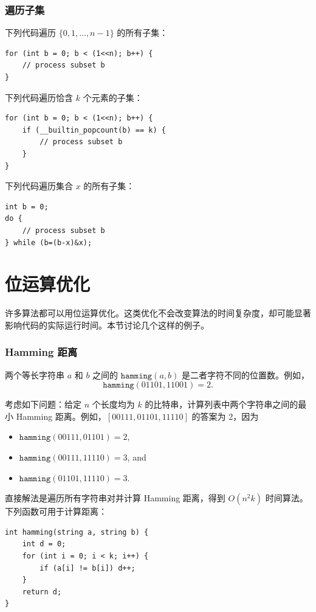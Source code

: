 \subsubsection{遍历子集}

下列代码遍历 $\{0,1,\ldots,n-1\}$ 的所有子集：

\begin{lstlisting}
for (int b = 0; b < (1<<n); b++) {
    // process subset b
}
\end{lstlisting}
下列代码遍历恰含 $k$ 个元素的子集：
\begin{lstlisting}
for (int b = 0; b < (1<<n); b++) {
    if (__builtin_popcount(b) == k) {
        // process subset b
    }
}
\end{lstlisting}
下列代码遍历集合 $x$ 的所有子集：
\begin{lstlisting}
int b = 0;
do {
    // process subset b
} while (b=(b-x)&x);
\end{lstlisting}

\section{位运算优化}

许多算法都可以用位运算优化。这类优化不会改变算法的时间复杂度，却可能显著影响代码的实际运行时间。本节讨论几个这样的例子。

\subsubsection{Hamming 距离}

两个等长字符串 $a$ 和 $b$ 之间的 $\texttt{hamming}(a,b)$ 是二者字符不同的位置数。例如，
\[\texttt{hamming}(01101,11001)=2.\]

考虑如下问题：给定 $n$ 个长度均为 $k$ 的比特串，计算列表中两个字符串之间的最小 Hamming 距离。例如，$[00111,01101,11110]$ 的答案为 2，因为
\begin{itemize}[noitemsep]
\item $\texttt{hamming}(00111,01101)=2$,
\item $\texttt{hamming}(00111,11110)=3$, and
\item $\texttt{hamming}(01101,11110)=3$.
\end{itemize}

直接解法是遍历所有字符串对并计算 Hamming 距离，得到 $O(n^2k)$ 时间算法。下列函数可用于计算距离：
\begin{lstlisting}
int hamming(string a, string b) {
    int d = 0;
    for (int i = 0; i < k; i++) {
        if (a[i] != b[i]) d++;
    }
    return d;
}
\end{lstlisting}

